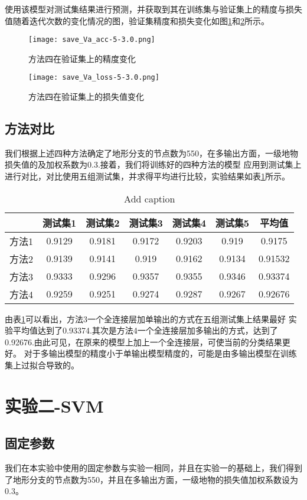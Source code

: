 \documentclass[lang=cn,11pt,a4paper,cite=authoryear]{elegantpaper}
\begin{document}
使用该模型对测试集结果进行预测，并获取到其在训练集与验证集上的精度与损失值随着迭代次数的变化情况的图，验证集精度和损失变化如图\ref{fig:val-acc4}和\ref{fig:val-loss4}所示。

\begin{figure}[!htb]
  \centering
  \texttt{[image: save\_Va\_acc-5-3.0.png]}
  \caption{方法四在验证集上的精度变化}
  \label{fig:val-acc4}
\end{figure}

\begin{figure}[!htb]
  \centering
  \texttt{[image: save\_Va\_loss-5-3.0.png]}
  \caption{方法四在验证集上的损失值变化}
  \label{fig:val-loss4}
\end{figure}


\subsection{方法对比}
我们根据上述四种方法确定了地形分支的节点数为550，在多输出方面，一级地物损失值的及加权系数为0.3.接着，我们将训练好的四种方法的模型
应用到测试集上进行对比，对比使用五组测试集，并求得平均进行比较，实验结果如表\ref{tab:table3}所示。
\begin{table}[htbp]
  \centering
  \caption{Add caption}
    \begin{tabular}{|c|c|c|c|c|c|c|}
    \toprule
          & 测试集1  & 测试集2  & 测试集3  & 测试集4  & 测试集5  & 平均值 \\
    \midrule
    方法1   & 0.9129 & 0.9181 & 0.9172 & 0.9203 & 0.919 & \cellcolor[rgb]{ 1,  .486,  .502}0.9175 \\
    \midrule
    方法2   & 0.9139 & 0.9141 & 0.919 & 0.9162 & 0.9134 & \cellcolor[rgb]{ 1,  .8,  .8}0.91532 \\
    \midrule
    方法3   & 0.9333 & 0.9296 & 0.9357 & 0.9355 & 0.9346 & \cellcolor[rgb]{ .753,  0,  0}0.93374 \\
    \midrule
    方法4   & 0.9259 & 0.9251 & 0.9274 & 0.9287 & 0.9267 & \cellcolor[rgb]{ 1,  0,  0}0.92676 \\
    \bottomrule
    \end{tabular}%
  \label{tab:table3}%
\end{table}%

由表\ref{tab:table3}可以看出，方法3一个全连接层加单输出的方式在五组测试集上结果最好
实验平均值达到了0.93374.其次是方法4一个全连接层加多输出的方式，达到了0.92676.由此可见，在原来的模型上加上一个全连接层，可使当前的分类结果更好。
对于多输出模型的精度小于单输出模型精度的，可能是由多输出模型在训练集上过拟合导致的。





\section{实验二-SVM}
\subsection{固定参数}
我们在本实验中使用的固定参数与实验一相同，并且在实验一的基础上，我们得到了地形分支的节点数为550，并且在多输出方面，一级地物的损失值加权系数设为0.3。
\end{document}
